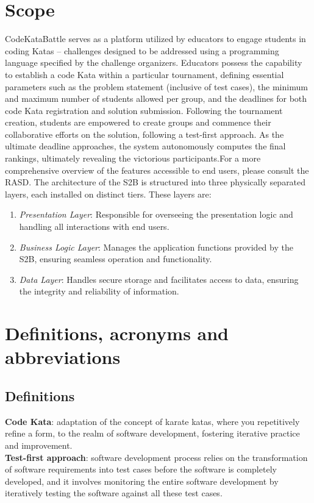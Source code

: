 \documentclass[12pt, a4paper]{report}
\begin{document}
    \section{Scope}
    CodeKataBattle serves as a platform utilized by educators to engage students in coding Katas – challenges designed to be addressed using a programming language specified by the challenge organizers. 
    Educators possess the capability to establish a code Kata within a particular tournament, defining essential parameters such as the problem statement (inclusive of test cases), 
    the minimum and maximum number of students allowed per group, and the deadlines for both code Kata registration and solution submission.
    Following the tournament creation, students are empowered to create groups and commence their collaborative efforts on the solution, following a test-first approach. 
    As the ultimate deadline approaches, the system autonomously computes the final rankings, ultimately revealing the victorious participants.For a more comprehensive overview of the features accessible to end users, please consult the RASD. 
    The architecture of the S2B is structured into three physically separated layers, each installed on distinct tiers. These layers are:
    \\
    
        \begin{enumerate}
            \item \textit{Presentation Layer}: Responsible for overseeing the presentation logic and handling all interactions with end users.
            \item \textit{Business Logic Layer}: Manages the application functions provided by the S2B, ensuring seamless operation and functionality.
            \item \textit{Data Layer}: Handles secure storage and facilitates access to data, ensuring the integrity and reliability of information.
        \end{enumerate}

    \section{Definitions, acronyms and abbreviations}
    \subsection{Definitions}
    \textbf{Code Kata}: adaptation of the concept of karate katas, where you repetitively refine a form, to the realm of software development, 
        fostering iterative practice and improvement. 
    \\
    \textbf{Test-first approach}:  software development process relies on the transformation of software requirements into test cases before 
        the software is completely developed, and it involves monitoring the entire software development by iteratively testing the software 
        against all these test cases.
\end{document}
